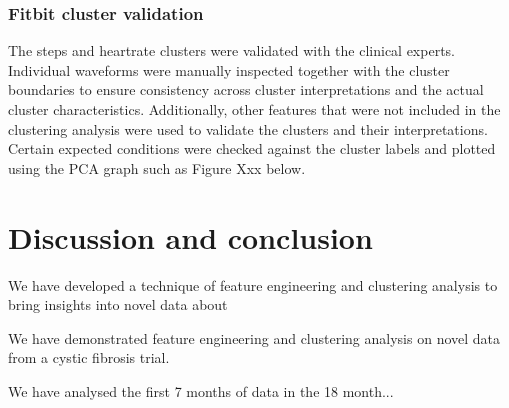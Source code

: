 \documentclass{article}
\begin{document}
\subsubsection{Fitbit cluster validation }

The steps and heartrate clusters were validated with the clinical experts. Individual waveforms were manually inspected together with the cluster boundaries to ensure consistency across cluster interpretations and the actual cluster characteristics. Additionally, other features that were not included in the clustering analysis were used to validate the clusters and their interpretations. Certain expected conditions were checked against the cluster labels and plotted using the PCA graph such as Figure Xxx below. 


\section{Discussion and conclusion} 

We have developed a technique of feature engineering and clustering analysis to bring insights into novel data about 

We have demonstrated feature engineering and clustering analysis on novel data from a cystic fibrosis trial.  

We have analysed the first 7 months of data in the 18 month...





\end{document}
